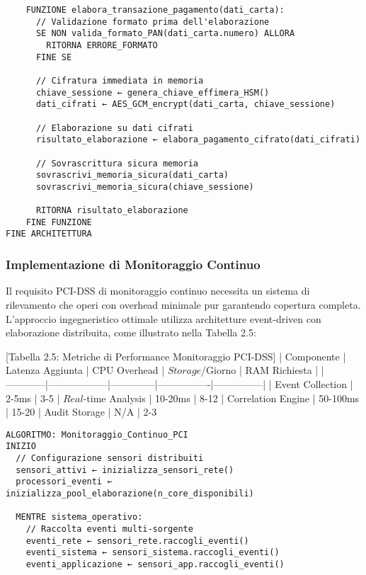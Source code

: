 {\begin{verbatim}
    FUNZIONE elabora_transazione_pagamento(dati_carta):
      // Validazione formato prima dell'elaborazione
      SE NON valida_formato_PAN(dati_carta.numero) ALLORA
        RITORNA ERRORE_FORMATO
      FINE SE
      
      // Cifratura immediata in memoria
      chiave_sessione ← genera_chiave_effimera_HSM()
      dati_cifrati ← AES_GCM_encrypt(dati_carta, chiave_sessione)
      
      // Elaborazione su dati cifrati
      risultato_elaborazione ← elabora_pagamento_cifrato(dati_cifrati)
      
      // Sovrascrittura sicura memoria
      sovrascrivi_memoria_sicura(dati_carta)
      sovrascrivi_memoria_sicura(chiave_sessione)
      
      RITORNA risultato_elaborazione
    FINE FUNZIONE
FINE ARCHITETTURA
\end{verbatim}

\subsubsection{Implementazione di Monitoraggio Continuo}

Il requisito PCI-DSS di monitoraggio continuo necessita un sistema di rilevamento che operi con overhead minimale pur garantendo copertura completa. L'approccio ingegneristico ottimale utilizza architetture event-driven con elaborazione distribuita, come illustrato nella Tabella 2.5:

[Tabella 2.5: Metriche di Performance Monitoraggio PCI-DSS]
| Componente | Latenza Aggiunta | CPU Overhead | $Storage$/Giorno | RAM Richiesta |
|------------|------------------|--------------|----------------|---------------|
| Event Collection | 2-5ms | 3-5%
| $Real$-time Analysis | 10-20ms | 8-12%
| Correlation Engine | 50-100ms | 15-20%
| Audit Storage | N/A | 2-3%

\begin{verbatim}
ALGORITMO: Monitoraggio_Continuo_PCI
INIZIO
  // Configurazione sensori distribuiti
  sensori_attivi ← inizializza_sensori_rete()
  processori_eventi ← inizializza_pool_elaborazione(n_core_disponibili)
  
  MENTRE sistema_operativo:
    // Raccolta eventi multi-sorgente
    eventi_rete ← sensori_rete.raccogli_eventi()
    eventi_sistema ← sensori_sistema.raccogli_eventi()  
    eventi_applicazione ← sensori_app.raccogli_eventi()
    

\end{verbatim}}
